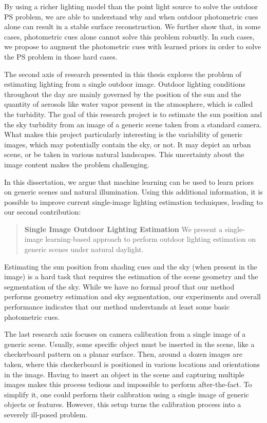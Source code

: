 By using a richer lighting model than the point light source to solve the outdoor PS problem, we are able to understand why and when outdoor photometric cues alone can result in a stable surface reconstruction. We further show that, in some cases, photometric cues alone cannot solve this problem robustly. In such cases, we propose to augment the photometric cues with learned priors in order to solve the PS problem in those hard cases. 

The second axis of research presented in this thesis explores the problem of estimating lighting from a single outdoor image. Outdoor lighting conditions throughout the day are mainly governed by the position of the sun and the quantity of aerosols like water vapor present in the atmosphere, which is called the turbidity. The goal of this research project is to estimate the sun position and the sky turbidity from an image of a generic scene taken from a standard camera. What makes this project particularly interesting is the variability of generic images, which may potentially contain the sky, or not. It may depict an urban scene, or be taken in various natural landscapes. This uncertainty about the image content makes the problem challenging. 

In this dissertation, we argue that machine learning can be used to learn priors on generic scenes and natural illumination. Using this additional information, it is possible to improve current single-image lighting estimation techniques, leading to our second contribution: 

\begin{quotation}
\textbf{Single Image Outdoor Lighting Estimation} We present a single-image learning-based approach to perform outdoor lighting estimation on generic scenes under natural daylight. 
\end{quotation}

Estimating the sun position from shading cues and the sky (when present in the image) is a hard task that requires the estimation of the scene geometry and the segmentation of the sky. While we have no formal proof that our method performs geometry estimation and sky segmentation, our experiments and overall performance indicates that our method understands at least some basic photometric cues.


The last research axis focuses on camera calibration from a single image of a generic scene. %
Usually, some specific object must be inserted in the scene, like a checkerboard pattern on a planar surface. Then, around a dozen images are taken, where this checkerboard is positioned in various locations and orientations in the image. Having to insert an object in the scene and capturing multiple images makes this process tedious and impossible to perform after-the-fact. To simplify it, one could perform their calibration using a single image of generic objects or features. However, this setup turns the calibration process into a severely ill-posed problem. 

